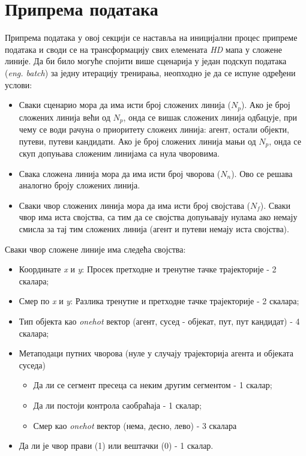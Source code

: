 \documentclass[11pt,oneside]{memoir}
\begin{document}
\section{Припрема података}

Припрема података у овој секцији се наставља на иницијални процес припреме података и своди се на трансформацију свих елемената
\textit{HD} мапа у сложене линије. Да би било могуће спојити више сценарија у један подскуп података (\textit{eng. batch}) 
за једну итерацију тренирања, неопходно је да се испуне одређени услови:
\begin{itemize}
  \item Сваки сценарио мора да има исти број сложених линија ($N_{p}$). Ако је број сложених линија већи од $N_{p}$, онда се 
        вишак сложених линија одбацује, при чему се води рачуна о приоритету сложеих линија: агент, остали објекти, путеви, путеви кандидати.
        Ако је број сложених линија мањи од $N_{p}$, онда се скуп допуњава сложеним линијама са нула чворовима.
  \item Свака сложена линија мора да има исти број чворова ($N_{n}$). Ово се решава аналогно броју сложених линија.
  \item Сваки чвор сложених линија мора да има исти број својстава ($N_{f}$). Сваки чвор има иста својства, са тим
        да се својства допуњавају нулама ако немају смисла за тај тим сложених линија (агент и путеви немају иста својства).
\end{itemize}

\noindent Сваки чвор сложене линије има следећа својства:
\begin{itemize}
  \item Координате \textit{x} и \textit{y}: Просек претходне и тренутне тачке трајекторије - 2 скалара;
  \item Смер по \textit{x} и \textit{y}: Разлика тренутне и претходне тачке трајекторије - 2 скалара;
  \item Тип објекта као \textit{onehot} вектор (агент, сусед - објекат, пут, пут кандидат) - 4 скалара;
  \item Метаподаци путних чворова (нуле у случају трајекторија агента и објеката суседа)
    \begin{itemize}
      \item Да ли се сегмент пресеца са неким другим сегментом - 1 скалар;
      \item Да ли постоји контрола саобраћаја - 1 скалар;
      \item Смер као \textit{onehot} вектор (нема, десно, лево) - 3 скалара
    \end{itemize}
  \item Да ли је чвор прави (1) или вештачки (0) - 1 скалар.
\end{itemize}
\end{document}
